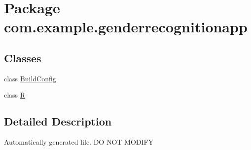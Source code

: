 \hypertarget{namespacecom_1_1example_1_1genderrecognitionapp}{}\section{Package com.\+example.\+genderrecognitionapp}
\label{namespacecom_1_1example_1_1genderrecognitionapp}
\subsection*{Classes}
\begin{DoxyCompactItemize}
\item 
class \hyperlink{classcom_1_1example_1_1genderrecognitionapp_1_1_build_config}{Build\+Config}
\item 
class \hyperlink{classcom_1_1example_1_1genderrecognitionapp_1_1_r}{R}
\end{DoxyCompactItemize}


\subsection{Detailed Description}
Automatically generated file. D\+O N\+O\+T M\+O\+D\+I\+F\+Y 